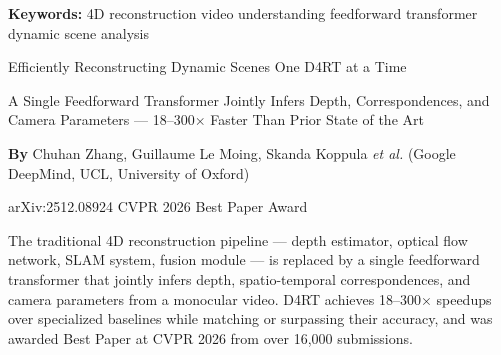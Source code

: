 \documentclass[10pt,twocolumn]{article}
\begin{document}
\setlength{\parindent}{0pt}
\setlength{\parskip}{4pt}

{\small\color{keywordgray}\textbf{Keywords:}
  4D reconstruction \textbullet{}
  video understanding \textbullet{}
  feedforward transformer \textbullet{}
  dynamic scene analysis}\par\vspace{4pt}

{\LARGE\bfseries\raggedright
  Efficiently Reconstructing Dynamic Scenes One D4RT at a Time}\par\vspace{4pt}

{\large\itshape\raggedright
  A Single Feedforward Transformer Jointly Infers Depth, Correspondences,
  and Camera Parameters --- 18--300$\times$ Faster Than Prior State of the Art}\par\vspace{6pt}

{\small\textbf{By} Chuhan Zhang, Guillaume Le Moing, Skanda Koppula \textit{et al.}
  (Google DeepMind, UCL, University of Oxford)}\par\vspace{2pt}

{\small\color{keywordgray}arXiv:2512.08924 \textbullet{}
  CVPR 2026 Best Paper Award}
\par\vspace{2pt}\noindent{\color{rulered}\rule{\columnwidth}{0.6pt}}\vspace{6pt}

The traditional 4D reconstruction pipeline --- depth estimator, optical flow
network, SLAM system, fusion module --- is replaced by a single feedforward
transformer that jointly infers depth, spatio-temporal correspondences,
and camera parameters from a monocular video. D4RT achieves 18--300$\times$
speedups over specialized baselines while matching or surpassing their
accuracy, and was awarded Best Paper at CVPR 2026 from over 16,000 submissions.
\end{document}
